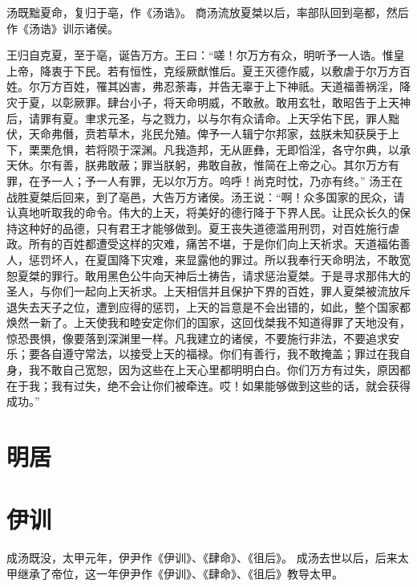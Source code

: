 \documentclass[12pt,UTF8]{ctexbook}
\begin{document}
汤既黜夏命，复归于亳，作《汤诰》。
商汤流放夏桀以后，率部队回到亳都，然后作《汤诰》训示诸侯。

王归自克夏，至于亳，诞告万方。王曰：“嗟！尔万方有众，明听予一人诰。惟皇上帝，降衷于下民。若有恒性，克绥厥猷惟后。夏王灭德作威，以敷虐于尔万方百姓。尔万方百姓，罹其凶害，弗忍荼毒，并告无辜于上下神祇。天道福善祸淫，降灾于夏，以彰厥罪。肆台小子，将天命明威，不敢赦。敢用玄牡，敢昭告于上天神后，请罪有夏。聿求元圣，与之戮力，以与尔有众请命。上天孚佑下民，罪人黜伏，天命弗僭，贲若草木，兆民允殖。俾予一人辑宁尔邦家，兹朕未知获戾于上下，栗栗危惧，若将陨于深渊。凡我造邦，无从匪彝，无即慆淫，各守尔典，以承天休。尔有善，朕弗敢蔽；罪当朕躬，弗敢自赦，惟简在上帝之心。其尔万方有罪，在予一人；予一人有罪，无以尔万方。呜呼！尚克时忱，乃亦有终。”
汤王在战胜夏桀后回来，到了亳邑，大告万方诸侯。汤王说：“啊！众多国家的民众，请认真地听取我的命令。伟大的上天，将美好的德行降于下界人民。让民众长久的保持这种好的品德，只有君王才能够做到。夏王丧失道德滥用刑罚，对百姓施行虐政。所有的百姓都遭受这样的灾难，痛苦不堪，于是你们向上天祈求。天道福佑善人，惩罚坏人，在夏国降下灾难，来显露他的罪过。所以我奉行天命明法，不敢宽恕夏桀的罪行。敢用黑色公牛向天神后土祷告，请求惩治夏桀。于是寻求那伟大的圣人，与你们一起向上天祈求。上天相信并且保护下界的百姓，罪人夏桀被流放斥退失去天子之位，遭到应得的惩罚，上天的旨意是不会出错的，如此，整个国家都焕然一新了。上天使我和睦安定你们的国家，这回伐桀我不知道得罪了天地没有，惊恐畏惧，像要落到深渊里一样。凡我建立的诸侯，不要施行非法，不要追求安乐；要各自遵守常法，以接受上天的福禄。你们有善行，我不敢掩盖；罪过在我自身，我不敢自己宽恕，因为这些在上天心里都明明白白。你们万方有过失，原因都在于我；我有过失，绝不会让你们被牵连。哎！如果能够做到这些的话，就会获得成功。”
\chapter{明居}
\chapter{伊训}

成汤既没，太甲元年，伊尹作《伊训》、《肆命》、《徂后》。
成汤去世以后，后来太甲继承了帝位，这一年伊尹作《伊训》、《肆命》、《徂后》教导太甲。
\end{document}

